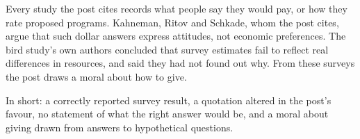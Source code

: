 \begin{afterword}
Every study the post cites records what people say they would pay, or how they rate proposed programs. Kahneman, Ritov and Schkade, whom the post cites, argue that such dollar answers express attitudes, not economic preferences. The bird study's own authors concluded that survey estimates fail to reflect real differences in resources, and said they had not found out why. From these surveys the post draws a moral about how to give.

In short: a correctly reported survey result, a quotation altered in the post's favour, no statement of what the right answer would be, and a moral about giving drawn from answers to hypothetical questions.
\end{afterword}
